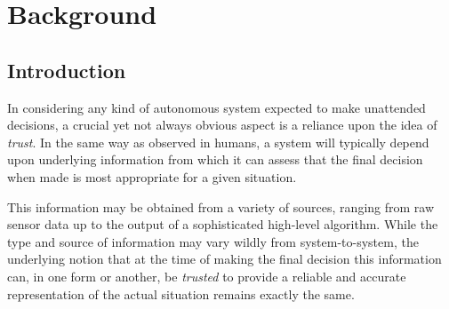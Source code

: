 \section{Background}

\subsection{Introduction}

%

 In considering any kind of autonomous system expected to make unattended decisions, a crucial yet not always obvious aspect is a reliance upon the idea of \textit{trust}. In the same way as observed in humans, a system will typically depend upon underlying information from which it can assess that the final decision when made is most appropriate for a given situation.
 
 This information may be obtained from a variety of sources, ranging from raw sensor data up to the output of a sophisticated high-level algorithm. While the type and source of information may vary wildly from system-to-system, the underlying notion that at the time of making the final decision this information can, in one form or another, be \textit{trusted} to provide a reliable and accurate representation of the actual situation remains exactly the same. 
 

